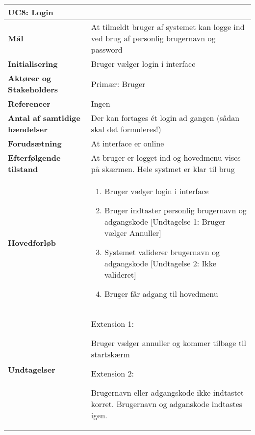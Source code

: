 \begin{table}[H] \centering
\begin{tabular}{|p{6cm}|p{8cm}|}
	\hline
\multicolumn{2}{|l|}{\textbf{UC8: Login}} \\\hline
\textbf{Mål}								
&At tilmeldt bruger af systemet kan logge ind ved brug af personlig brugernavn og password
 \\\hline
\textbf{Initialisering}					
&Bruger vælger login i interface
 \\\hline
\textbf{Aktører og Stakeholders}			
&Primær: Bruger
 \\\hline
\textbf{Referencer}						
&Ingen
 \\\hline
\textbf{Antal af samtidige hændelser}	
&Der kan fortages ét login ad gangen (sådan skal det formuleres!)
 \\\hline
\textbf{Forudsætning}					
&At interface er online
 \\\hline
\textbf{Efterfølgende tilstand}			
&At bruger er logget ind og hovedmenu vises på skærmen. Hele systmet er klar til brug
 \\\hline
\textbf{Hovedforløb}						
& 
\begin{enumerate}

\item Bruger vælger login i interface

\item Bruger indtaster personlig brugernavn og adgangskode [Undtagelse 1: Bruger vælger Annuller]

\item Systemet validerer brugernavn og adgangskode [Undtagelse 2: Ikke valideret]

\item Bruger får adgang til hovedmenu
 
\end{enumerate}
\\\hline

\textbf{Undtagelser}						&

Extension 1:

Bruger vælger annuller og kommer tilbage til startskærm

Extension 2: 

Brugernavn eller adgangskode ikke indtastet korret. Brugernavn og adganskode indtastes igen. \\\hline
	\end{tabular}
	\label{UC8} 
\end{table}